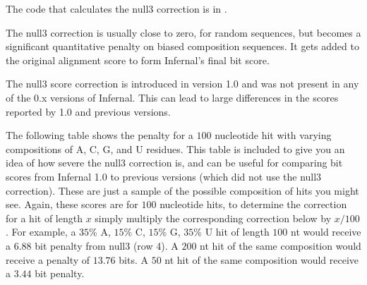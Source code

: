 The code that calculates the null3 correction is in 
.

The null3 correction is usually close to zero, for random sequences,
but becomes a significant quantitative penalty on biased composition
sequences.  It gets added to the original alignment score to form
Infernal's final bit score.

The null3 score correction is introduced in version 1.0 and was not
present in any of the 0.x versions of Infernal. This can
lead to large differences in the scores reported by 1.0 and previous
versions. 

The following table shows the penalty for a $100$ nucleotide hit with
varying compositions of A, C, G, and U residues. This table is included to give you
an idea of how severe the null3 correction is, and can be useful for
comparing bit scores from Infernal 1.0 to previous
versions (which did not use the null3 correction). These are just a
sample of the possible composition of hits you might see. Again, these
scores are for $100$ nucleotide hits, to determine the correction for
a hit of length $x$ simply multiply the corresponding correction below
by $x/100$. For example, a $35$\% A, $15$\% C, $15$\% G, $35$\% U hit
of length $100$ nt would receive a $6.88$ bit penalty from
null3 (row 4). A $200$ nt hit of the same composition would
receive a penalty of $13.76$ bits. A $50$ nt hit of the same
composition would receive a $3.44$ bit penalty.

\vspace{0.5in}

